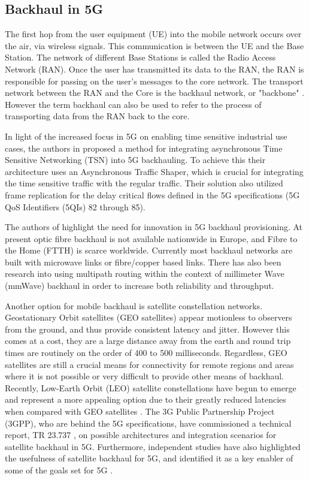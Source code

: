 \subsection{Backhaul in 5G}

The first hop from the user equipment (UE) into the mobile network occurs over the air, via wireless signals. This communication is between the UE and the Base Station. The network of different Base Stations is called the Radio Access Network (RAN). Once the user has transmitted its data to the RAN, the RAN is responsible for passing on the user's messages to the core network. The transport network between the RAN and the Core is the backhaul network, or "backbone" \cite{jaber20165g}. However the term backhaul can also be used to refer to the process of transporting data from the RAN back to the core.

In light of the increased focus in 5G on enabling time sensitive industrial use cases, the authors in \cite{prados2021asynchronous} proposed a method for integrating asynchronous Time Sensitive Networking (TSN) into 5G backhauling. To achieve this their architecture uses an Asynchronous Traffic Shaper, which is crucial for integrating the time sensitive traffic with the regular traffic. Their solution also utilized frame replication for the delay critical flows defined in the 5G specifications (5G QoS Identifiers (5QIs) 82 through 85).

The authors of \cite{jaber20165g} highlight the need for innovation in 5G backhaul provisioning. At present optic fibre backhaul is not available nationwide in Europe, and Fibre to the Home (FTTH) is scarce worldwide. Currently most backhaul networks are built with microwave links or fibre/copper based links. There has also been research \cite{seppanen2016multipath, saadat2018multipath} into using multipath routing within the context of millimeter Wave (mmWave) backhaul in order to increase both reliability and throughput.

Another option for mobile backhaul is satellite constellation networks. Geostationary Orbit satellites (GEO satellites) appear motionless to observers from the ground, and thus provide consistent latency and jitter. However this comes at a cost, they are a large distance away from the earth and round trip times are routinely on the order of 400 to 500 milliseconds. Regardless, GEO satellites are still a crucial means for connectivity for remote regions and areas where it is not possible or very difficult to provide other means of backhaul. Recently, Low-Earth Orbit (LEO) satellite constellations have begun to emerge and represent a more appealing option due to their greatly reduced latencies when compared with GEO satellites \cite{deutschmann2022broadband}. The 3G Public Partnership Project (3GPP), who are behind the 5G specifications, have commissioned a technical report, TR 23.737 \cite{3gpp.23.737}, on possible architectures and integration scenarios for satellite backhaul in 5G. Furthermore, independent studies have also highlighted the usefulness of satellite backhaul for 5G, and identified it as a key enabler of some of the goals set for 5G \cite{artiga2016terrestrial}.

